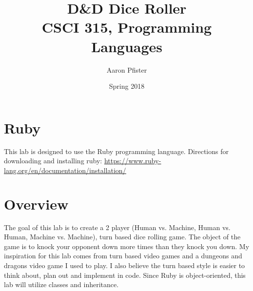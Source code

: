 \documentclass{article}
\begin{document}
\title{D\&D Dice Roller \\ \large{\sc CSCI 315, Programming Languages}}
\author{Aaron Pfister}
\date{Spring 2018}
\maketitle

\section*{Ruby}
This lab is designed to use the Ruby programming language. Directions for downloading and installing ruby: \href{https://www.ruby-lang.org/en/documentation/installation/}{\underline{https://www.ruby-lang.org/en/documentation/installation/}}

\section*{Overview}
The goal of this lab is to create a 2 player (Human vs. Machine, Human vs. Human, Machine vs. Machine), turn based dice rolling game. The object of the game is to knock your opponent down more times than they knock you down. My inspiration for this lab comes from turn based video games and a dungeons and dragons video game I used to play. I also believe the turn based style is easier to think about, plan out and implement in code. Since Ruby is object-oriented, this lab will utilize classes and inheritance. 

\end{document}
